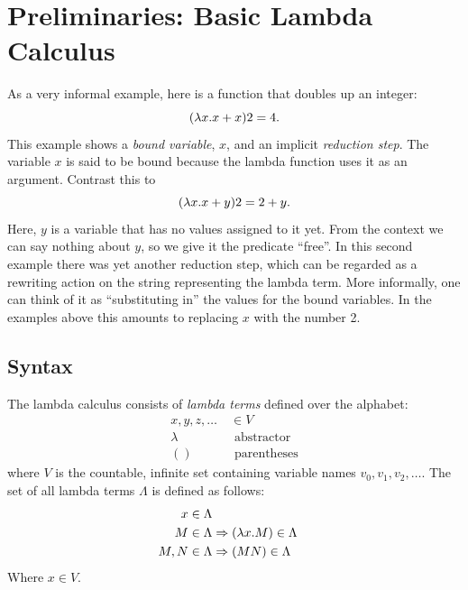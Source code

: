 
\chapter{Preliminaries: Basic Lambda Calculus}




As a very informal example, here is a function that doubles up an integer:
\begin{equation*}
	(\lambda x.x+x)2=4.
\end{equation*}
This example shows a \emph{bound variable}, $x$, and an implicit \emph{reduction step}. The variable $x$
is said to be bound because the lambda function uses it as an argument. Contrast this to
\begin{equation*}
	(\lambda x.x+y)2=2+y.
\end{equation*}
Here, $y$ is a variable that has no values assigned to it yet. From
the context we can say nothing about $y$, so we give it the predicate
``free''. In this second example there was yet another reduction step, which 
can be regarded as a rewriting action on the string representing the
lambda term. More informally, one can think of it as ``substituting in''
the values for the bound variables. In the examples above this amounts to
replacing $x$ with the number 2.

\section{Syntax}
\begin{definition}
	The lambda calculus consists of \emph{lambda terms} defined over the alphabet:
	\begin{align*}
		x,y,z,\hdots\ &\in V\\
		\lambda\ &\text{ abstractor} \\
		()\ &\text{ parentheses}
	\end{align*}
	where $V$ is the countable, infinite set containing variable names $v_0,v_1,v_2,\hdots$.
	The set of all lambda terms $\Lambda$ is defined as follows:
	\begin{align*}
		x\in\Lambda \\
		M\in\Lambda &\Rightarrow (\lambda x.M)\in\Lambda \\
		M, N\in\Lambda &\Rightarrow (M N)\in\Lambda
	\end{align*}
Where $x\in V$.
\end{definition}

